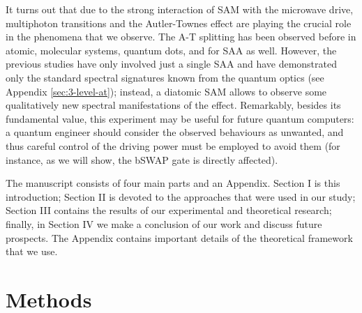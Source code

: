 \documentclass[%
 pra,
 amsmath,amssymb,
 reprint,%
]{revtex4-1}
\begin{document}
It turns out that due to the strong interaction of SAM with the microwave drive, multiphoton transitions and the Autler-Townes effect are playing the crucial role in the phenomena that we observe. The A-T splitting has been observed before in atomic\cite{picque1976direct}, molecular systems\cite{tamarat1995pump}, quantum dots\cite{xu2007coherent}, and for SAA as well\cite{baur2009measurement, sillanpaa2009autler, novikov2013autler, suri2013observation, peng2018vacuum}. However, the previous studies have  only involved just a single SAA and have demonstrated only the standard spectral signatures known from the quantum optics (see Appendix \ref{sec:3-level-at}); instead, a diatomic SAM allows to observe some qualitatively new spectral manifestations of the effect. Remarkably, besides its fundamental value, this experiment may be useful for future quantum computers: a quantum engineer should consider the observed behaviours as unwanted, and thus careful control of the driving power must be employed to avoid them (for instance, as we will show, the bSWAP gate\cite{poletto2012entanglement} is directly affected).

The manuscript consists of four main parts and an Appendix. Section I is this introduction; Section II is devoted to the approaches that were used in our study; Section III contains the results of our experimental and theoretical research; finally, in Section IV we make a conclusion of our work and discuss future prospects. The Appendix contains important details of the theoretical framework that we use.

\section{Methods}
\end{document}
